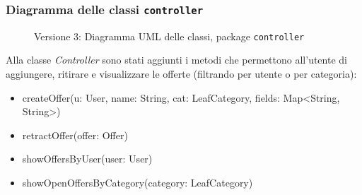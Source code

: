 \subsubsection{Diagramma delle classi \texttt{controller}}
\vspace{0.5cm}
\begin{figure}[H]
    \centering
    \caption{Versione 3: Diagramma UML delle classi, package \texttt{controller}}
    \label{fig:class_controller_v_3}
\end{figure}

Alla classe \textit{Controller} sono stati aggiunti i metodi che permettono all'utente di aggiungere, ritirare e visualizzare le offerte (filtrando per utente o per categoria):
\begin{itemize}
    \item createOffer(u: User, name: String, cat: LeafCategory, fields: Map<String, String>)
    \item retractOffer(offer: Offer)
    \item showOffersByUser(user: User)
    \item showOpenOffersByCategory(category: LeafCategory)
\end{itemize}